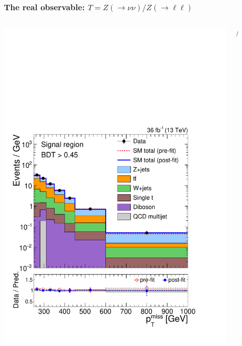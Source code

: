 \documentclass[aspectratio=169,xcolor=dvipsnames,,table,compress]{beamer}
\begin{document}
\begin{frame} \frametitle{The real observable: $T = Z(\rightarrow\nu\nu)/Z(\rightarrow \ell\ell)$}
  \vspace{-5mm}
  \begin{columns}
    \begin{column}{0.3\textwidth}
      \includegraphics[width=\textwidth]{../figures/monotop/postfit/stackedPostfit_signal_monotop.pdf}
    \end{column}
    \begin{column}{0.05\textwidth} $\Big/$ \end{column}
    \begin{column}{0.3\textwidth}

\end{column}
\end{columns}
\end{frame}
\end{document}
